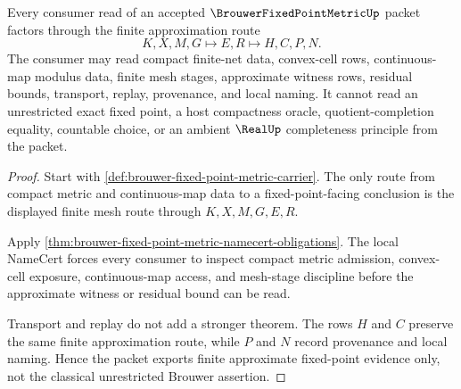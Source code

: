 \begin{theorem}
\label{thm:brouwer-fixed-point-metric-finite-approximation-nonescape}
Every consumer read of an accepted $\BrouwerFixedPointMetricUp$ packet factors through the finite approximation route
$$
K,X,M,G \longmapsto E,R \longmapsto H,C,P,N .
$$
The consumer may read compact finite-net data, convex-cell rows, continuous-map modulus data, finite mesh stages, approximate witness rows, residual bounds, transport, replay, provenance, and local naming. It cannot read an unrestricted exact fixed point, a host compactness oracle, quotient-completion equality, countable choice, or an ambient $\RealUp$ completeness principle from the packet.
\end{theorem}
\begin{proof}
Start with \autoref{def:brouwer-fixed-point-metric-carrier}. The only route from compact metric and continuous-map data to a fixed-point-facing conclusion is the displayed finite mesh route through $K,X,M,G,E,R$.

Apply \autoref{thm:brouwer-fixed-point-metric-namecert-obligations}. The local NameCert forces every consumer to inspect compact metric admission, convex-cell exposure, continuous-map access, and mesh-stage discipline before the approximate witness or residual bound can be read.

Transport and replay do not add a stronger theorem. The rows $H$ and $C$ preserve the same finite approximation route, while $P$ and $N$ record provenance and local naming. Hence the packet exports finite approximate fixed-point evidence only, not the classical unrestricted Brouwer assertion.
\end{proof}


\begin{closurestatus}{\BrouwerFixedPointMetricUp}
  \theoryclosure{\seedClosure}
  \formalstatus{\unformalizedV}
\end{closurestatus}
